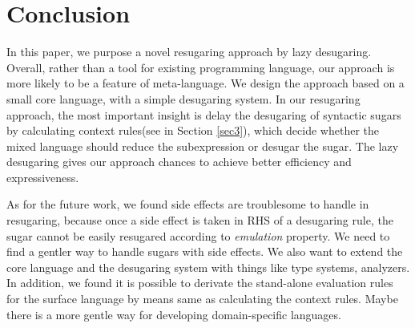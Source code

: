 \section{Conclusion}
\label{sec7}


In this paper, we purpose a novel resugaring approach by lazy desugaring.
Overall, rather than a tool for existing programming language, our approach is more likely to be a feature of meta-language. We design the approach based on a small core language, with a simple desugaring system.
In our resugaring approach, the most important insight is delay the desugaring of syntactic sugars by calculating context rules(see in Section \ref{sec3}), which decide whether the mixed language should reduce the subexpression or desugar the sugar. The lazy desugaring gives our approach chances to achieve better efficiency and expressiveness.



As for the future work, we found side effects are troublesome to handle in resugaring, because once a side effect is taken in RHS of a desugaring rule, the sugar cannot be easily resugared according to \emph{emulation} property. We need to find a gentler way to handle sugars with side effects. We also want to extend the core language and the desugaring system with things like type systems, analyzers. In addition, we found it is possible to derivate the stand-alone evaluation rules for the surface language by means same as calculating the context rules. Maybe there is a more gentle way for developing domain-specific languages.
